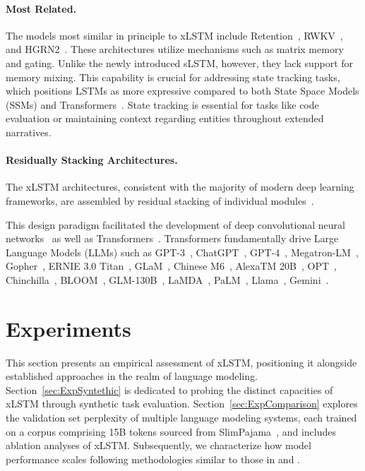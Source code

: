 \paragraph{Most Related.} The models most similar in principle to xLSTM include Retention~\citep{Sun:23arxiv}, RWKV~\citep{Peng:23arxivshort,Peng:24arxivshort}, and HGRN2~\citep{Qin:24arxiv}. These architectures utilize mechanisms such as matrix memory and gating. Unlike the newly introduced sLSTM, however, they lack support for memory mixing. This capability is crucial for addressing state tracking tasks, which positions LSTMs as more expressive compared to both State Space Models (SSMs) and Transformers~\citep{Merrill:24,Deletang:23}. State tracking is essential for tasks like code evaluation or maintaining context regarding entities throughout extended narratives.

\paragraph{Residually Stacking Architectures.} The xLSTM architectures, consistent with the majority of modern deep learning frameworks, are assembled by residual stacking of individual modules~\citep{Srivastava:15,He:16}.

This design paradigm facilitated the development of deep convolutional neural networks~\citep{He:16} as well as Transformers~\citep{Vaswani:17}. Transformers fundamentally drive Large Language Models (LLMs) such as GPT-3~\citep{Brown:20short}, ChatGPT~\citep{Schulman:22short}, GPT-4~\citep{Achiam:23gpt4short}, Megatron-LM~\citep{Shoeybi:19}, Gopher~\citep{Rae:21short}, ERNIE 3.0 Titan~\citep{Wang:21arxivshort}, GLaM~\citep{Du:21glamshort}, Chinese M6~\citep{Lin:21}, AlexaTM 20B~\citep{Soltan:22}, OPT~\citep{Zhang:22opt}, Chinchilla~\citep{Hoffmann:22short}, BLOOM~\citep{Scao:22arxivshort}, GLM-130B~\citep{Zeng:22arxivshort}, LaMDA~\citep{Thoppilan:22short}, PaLM~\citep{Chowdhery:22short}, Llama~\citep{Touvron:23arxiv}, Gemini~\citep{GeminiTeam:23arxiv,Reid:24arxiv}.

\section{Experiments}
\label{sec:Exp}

This section presents an empirical assessment of xLSTM, positioning it alongside established approaches in the realm of language modeling. Section~\ref{sec:ExpSyntethic} is dedicated to probing the distinct capacities of xLSTM through synthetic task evaluation. Section~\ref{sec:ExpComparison} explores the validation set perplexity of multiple language modeling systems, each trained on a corpus comprising 15B tokens sourced from SlimPajama~\citep{Soboleva:23}, and includes ablation analyses of xLSTM. Subsequently, we characterize how model performance scales following methodologies similar to those in \citet{Kaplan:20} and \citet{Brown:20short}. 

